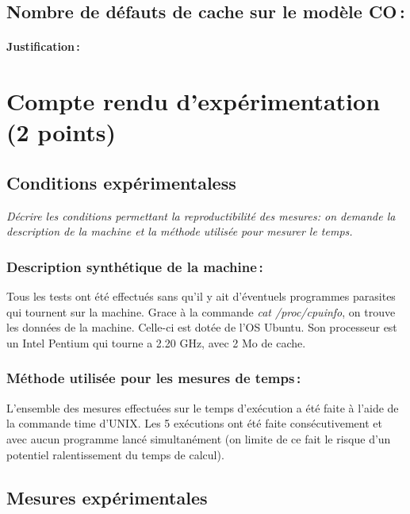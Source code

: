 \documentclass[a4paper, 10pt, french]{article}
\begin{document}
  \subsection{Nombre de défauts de cache sur le modèle CO\,: }
    \paragraph{Justification\,: }


\section{Compte rendu d'expérimentation (2 points)}
  \subsection{Conditions expérimentaless}
     {\em Décrire les conditions permettant la reproductibilité des mesures: on demande la description
      de la machine et la méthode utilisée pour mesurer le temps.
     }

    \subsubsection{Description synthétique de la machine\,:}
    
    Tous les tests ont été effectués sans qu'il y ait d'éventuels programmes parasites qui tournent sur la machine. Grace à la commande \textit{cat /proc/cpuinfo}, on trouve les données de la machine. Celle-ci est dotée de l'OS Ubuntu. Son processeur est un Intel Pentium qui tourne a 2.20 GHz, avec 2 Mo de cache.

    \subsubsection{Méthode utilisée pour les mesures de temps\,: } 
    
    L'ensemble des mesures effectuées sur le temps d'exécution a été faite à l'aide de la commande time d'UNIX. Les 5 exécutions ont été faite consécutivement et avec aucun programme lancé simultanément (on limite de ce fait le risque d'un potentiel ralentissement du temps de calcul).

  \subsection{Mesures expérimentales}
\end{document}

